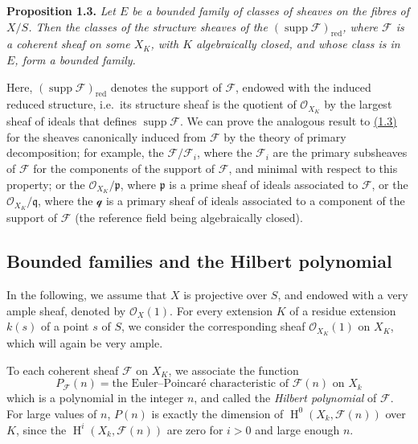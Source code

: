 \documentclass{article}
\newenvironment{itenv}[1]
  {\phantomsection\par\smallskip\noindent\textbf{#1.}\itshape}
  {\par\smallskip}
\theoremstyle{definition}
\theoremstyle{definition}
\theoremstyle{definition}
\theoremstyle{definition}
\theoremstyle{remark}
\begin{document}
\leavevmode{}%
\begin{itenv}{Proposition 1.3}
Let \(E\) be a bounded family of classes of sheaves on the fibres of \(X/S\).
Then the classes of the structure sheaves of the \((\operatorname{supp}{\mathscr{F}})_\mathrm{red}\), where \({\mathscr{F}}\) is a coherent sheaf on some \(X_K\), with \(K\) algebraically closed, and whose class is in \(E\), form a bounded family.

\end{itenv}

Here, \((\operatorname{supp}{\mathscr{F}})_\mathrm{red}\) denotes the support of \({\mathscr{F}}\), endowed with the induced reduced structure, i.e.~its structure sheaf is the quotient of \({\mathcal{O}}_{X_K}\) by the largest sheaf of ideals that defines \(\operatorname{supp}{\mathscr{F}}\).
We can prove the analogous result to \protect\hyperlink{fga-3-iv-proposition-1.3}{(1.3)} for the sheaves canonically induced from \({\mathscr{F}}\) by the theory of primary decomposition;
for example, the \({\mathscr{F}}/{\mathscr{F}}_i\), where the \({\mathscr{F}}_i\) are the primary subsheaves of \({\mathscr{F}}\) for the components of the support of \({\mathscr{F}}\), and minimal with respect to this property;
or the \({\mathcal{O}}_{X_K}/{\mathfrak{p}}\), where \({\mathfrak{p}}\) is a prime sheaf of ideals associated to \({\mathscr{F}}\), or the \({\mathcal{O}}_{X_K}/{\mathfrak{q}}\), where the \({\mathscr{q}}\) is a primary sheaf of ideals associated to a component of the support of \({\mathscr{F}}\) (the reference field being algebraically closed).

\hypertarget{fga-3-iv-section-2}{%
\subsection{Bounded families and the Hilbert polynomial}\label{fga-3-iv-section-2}}

In the following, we assume that \(X\) is projective over \(S\), and endowed with a very ample sheaf, denoted by \({\mathcal{O}}_X(1)\).
For every extension \(K\) of a residue extension \(k(s)\) of a point \(s\) of \(S\), we consider the corresponding sheaf \({\mathcal{O}}_{X_K}(1)\) on \(X_K\), which will again be very ample.

To each coherent sheaf \({\mathscr{F}}\) on \(X_K\), we associate the function
\[
  P_{\mathscr{F}}(n) = \text{the Euler--Poincaré characteristic of }{\mathscr{F}}(n)\text{ on }X_k
\]
which is a polynomial in the integer \(n\), and called the \emph{Hilbert polynomial} of \({\mathscr{F}}\).
For large values of \(n\), \(P(n)\) is exactly the dimension of \(\operatorname{H}^0(X_k,{\mathscr{F}}(n))\) over \(K\), since the \(\operatorname{H}^i(X_k,{\mathscr{F}}(n))\) are zero for \(i>0\) and large enough \(n\).
\end{document}
